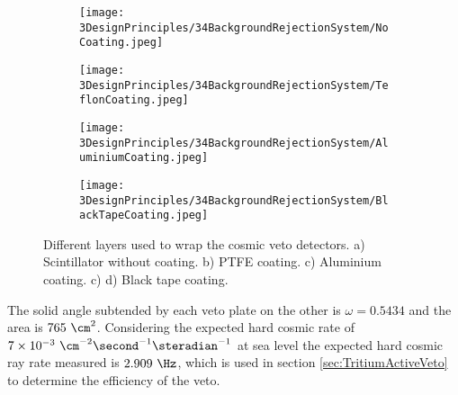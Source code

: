 \begin{figure}[h]
\centering
    \begin{subfigure}[b]{0.23\textwidth}
    \centering
    \texttt{[image: 3DesignPrinciples/34BackgroundRejectionSystem/NoCoating.jpeg]}  
    \caption{\label{subfig:PlasticScintillatorNoCoating}}
    \end{subfigure}
    \hfill
    \begin{subfigure}[b]{0.23\textwidth}
    \centering
    \texttt{[image: 3DesignPrinciples/34BackgroundRejectionSystem/TeflonCoating.jpeg]}  
    \caption{\label{subfig:PlasticScintillatorTeflon}}
    \end{subfigure}
    \hfill
    \begin{subfigure}[b]{0.23\textwidth}
    \centering
    \texttt{[image: 3DesignPrinciples/34BackgroundRejectionSystem/AluminiumCoating.jpeg]}  
    \caption{\label{subfig:PlasticScintillatorAluminium}}
    \end{subfigure}
    \hfill
    \begin{subfigure}[b]{0.23\textwidth}
    \centering
    \texttt{[image: 3DesignPrinciples/34BackgroundRejectionSystem/BlackTapeCoating.jpeg]}  
    \caption{\label{subfig:PlasticScintillatorBlackTape}}
    \end{subfigure}
 \caption{Different layers used to wrap the cosmic veto detectors. a) Scintillator without coating. b) PTFE coating. c) Aluminium coating. c) d) Black tape coating.}
 \label{fig:LayersVeto}
\end{figure}

The solid angle subtended by each veto plate on the other is $\omega=0.5434$ and the area is $765~\cm^2$. Considering the expected hard cosmic rate of $7 \times 10^{-3}~\cm^{-2}\second^{-1}\steradian^{-1}$ at sea level the expected hard cosmic ray rate measured is $2.909~\Hz$, which is used in section \ref{sec:TritiumActiveVeto} to determine the efficiency of the veto.